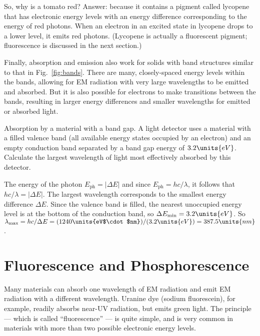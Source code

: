 So, why is a tomato red? Answer: because it contains a pigment called
lycopene that has electronic energy levels with an energy difference
corresponding to the energy of red photons. When an electron in an excited
state in lycopene drops to a lower level, it emits red photons. (Lycopene 
is actually a fluorescent pigment; fluorescence is discussed in the next
section.)

Finally, absorption and emission also work for solids with band structures
similar to that in Fig.~\ref{fig:bands}. There are many, closely-spaced
energy levels within the bands, allowing for EM radiation with very 
large wavelengths to be emitted and absorbed. But it is also possible for
electrons to make transitions between the bands, resulting in larger
energy differences and smaller wavelengths for emitted or absorbed light.
				
\begin{example}{Absorption by a material with a band gap.}
\label{exam:absorption_bands}
A light detector uses a material with a filled valence band (all available
energy states occupied by an electron) and an empty conduction band separated
by a band gap energy of $3.2\units{eV}$. Calculate the largest wavelength of light 
most effectively absorbed by this detector.

\begin{solution}
The energy of the photon $E_\text{ph} = |\Delta E|$
and since $E_\text{ph} = hc/\lambda$, it follows that $hc/\lambda = |\Delta E|$.
The largest wavelength corresponds to the smallest energy
difference $\Delta E$. Since the valence band is filled, the nearest 
unoccupied energy level is at the bottom of the conduction band, so
$\Delta E_\text{min} = 3.2\units{eV}$.
So $\lambda_\text{max} = hc/\Delta E 
            = (1240\units{eV$\cdot$nm})/(3.2 \units{eV}) = 387.5\units{nm}$. 
\end{solution}
\end{example}

\section{Fluorescence and Phosphorescence}
\label{sec:fluorescence_phosphorescence}

Many materials can absorb one wavelength of EM radiation and emit EM
radiation with a different wavelength. Uranine dye (sodium fluorescein),
for example, readily absorbs near-UV radiation, but emits green light. The
principle --- which is called ``fluorescence'' --- is quite simple,
and is very common in materials with more than two possible electronic
energy levels.


